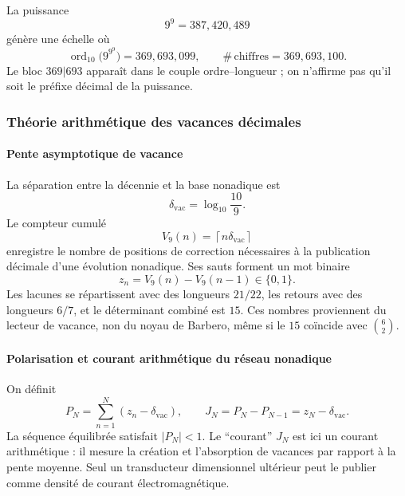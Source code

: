 La puissance
\[
9^9=387,420,489
\]
génère une échelle où
\begin{equation}
\operatorname{ord}_{10}\bigl(9^{9^9}\bigr)=369,693,099,
\qquad
\#\,\text{chiffres}=369,693,100.
\label{eq:369693}
\end{equation}
Le bloc \(369|693\) apparaît dans le couple ordre--longueur ; on n'affirme pas qu'il soit
le préfixe décimal de la puissance.

\subsubsection{Théorie arithmétique des vacances décimales}

\paragraph{Pente asymptotique de vacance}

La séparation entre la décennie et la base nonadique est
\begin{equation}
\delta_{\mathrm{vac}}=\log_{10}\frac{10}{9}.
\label{eq:delta-vac}
\end{equation}
Le compteur cumulé
\begin{equation}
V_9(n)=\left\lceil n\delta_{\mathrm{vac}}\right\rceil
\label{eq:vacancy-count}
\end{equation}
enregistre le nombre de positions de correction nécessaires à la publication décimale
d'une évolution nonadique. Ses sauts forment un mot binaire
\[
z_n=V_9(n)-V_9(n-1)\in\{0,1\}.
\]
Les lacunes se répartissent avec des longueurs \(21/22\), les retours avec des
longueurs \(6/7\), et le déterminant combiné est \(15\). Ces nombres
proviennent du lecteur de vacance, non du noyau de Barbero, même si le \(15\)
coïncide avec \(\binom62\).

\paragraph{Polarisation et courant arithmétique du réseau nonadique}

On définit
\begin{equation}
P_N=\sum_{n=1}^N(z_n-\delta_{\mathrm{vac}}),
\qquad
J_N=P_N-P_{N-1}=z_N-\delta_{\mathrm{vac}}.
\label{eq:arith-current}
\end{equation}
La séquence équilibrée satisfait \(|P_N|<1\). Le \enquote{courant}
\(J_N\) est ici un courant arithmétique : il mesure la création et l'absorption de
vacances par rapport à la pente moyenne. Seul un transducteur dimensionnel
ultérieur peut le publier comme densité de courant électromagnétique.

